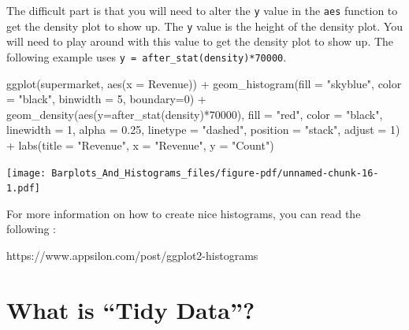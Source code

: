 \documentclass[
  letterpaper,
  DIV=11,
  numbers=noendperiod]{scrreprt}
\newenvironment{Shaded}{\begin{snugshade}}{\end{snugshade}}
\newcommand{\AttributeTok}[1]{\textcolor[rgb]{0.40,0.45,0.13}{#1}}
\newcommand{\DecValTok}[1]{\textcolor[rgb]{0.68,0.00,0.00}{#1}}
\newcommand{\FloatTok}[1]{\textcolor[rgb]{0.68,0.00,0.00}{#1}}
\newcommand{\FunctionTok}[1]{\textcolor[rgb]{0.28,0.35,0.67}{#1}}
\newcommand{\NormalTok}[1]{\textcolor[rgb]{0.00,0.23,0.31}{#1}}
\newcommand{\SpecialCharTok}[1]{\textcolor[rgb]{0.37,0.37,0.37}{#1}}
\newcommand{\StringTok}[1]{\textcolor[rgb]{0.13,0.47,0.30}{#1}}
\begin{document}
The difficult part is that you will need to alter the \texttt{y} value
in the \texttt{aes} function to get the density plot to show up. The
\texttt{y} value is the height of the density plot. You will need to
play around with this value to get the density plot to show up. The
following example uses \texttt{y\ =\ after\_stat(density)*70000}.

\begin{Shaded}
\begin{Highlighting}[]
\FunctionTok{ggplot}\NormalTok{(supermarket, }\FunctionTok{aes}\NormalTok{(}\AttributeTok{x =} \StringTok{\textasciigrave{}}\AttributeTok{Revenue}\StringTok{\textasciigrave{}}\NormalTok{)) }\SpecialCharTok{+}
  \FunctionTok{geom\_histogram}\NormalTok{(}\AttributeTok{fill =} \StringTok{"skyblue"}\NormalTok{, }\AttributeTok{color =} \StringTok{"black"}\NormalTok{, }\AttributeTok{binwidth =} \DecValTok{5}\NormalTok{, }\AttributeTok{boundary=}\DecValTok{0}\NormalTok{) }\SpecialCharTok{+}
  \FunctionTok{geom\_density}\NormalTok{(}\FunctionTok{aes}\NormalTok{(}\AttributeTok{y=}\FunctionTok{after\_stat}\NormalTok{(density)}\SpecialCharTok{*}\DecValTok{70000}\NormalTok{), }\AttributeTok{fill =} \StringTok{"red"}\NormalTok{, }\AttributeTok{color =} \StringTok{"black"}\NormalTok{, }
               \AttributeTok{linewidth =} \DecValTok{1}\NormalTok{, }\AttributeTok{alpha =} \FloatTok{0.25}\NormalTok{, }\AttributeTok{linetype =} \StringTok{"dashed"}\NormalTok{, }
               \AttributeTok{position =} \StringTok{"stack"}\NormalTok{, }\AttributeTok{adjust =} \DecValTok{1}\NormalTok{) }\SpecialCharTok{+}
  \FunctionTok{labs}\NormalTok{(}\AttributeTok{title =} \StringTok{"Revenue"}\NormalTok{,}
       \AttributeTok{x =} \StringTok{"Revenue"}\NormalTok{,}
       \AttributeTok{y =} \StringTok{"Count"}\NormalTok{)}
\end{Highlighting}
\end{Shaded}

\texttt{[image: Barplots\_And\_Histograms\_files/figure-pdf/unnamed-chunk-16-1.pdf]}

For more information on how to create nice histograms, you can read the
following :

https://www.appsilon.com/post/ggplot2-histograms


\chapter*{What is ``Tidy Data''?}\label{what-is-tidy-data}
\end{document}
